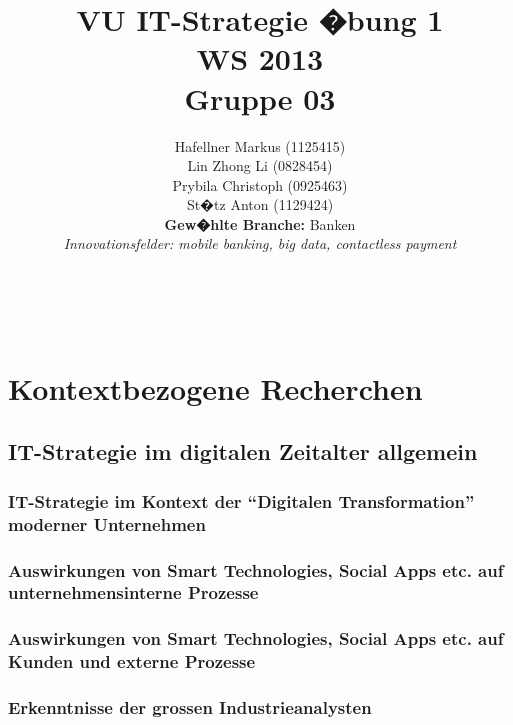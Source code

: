 \documentclass[a4paper, 11pt]{article} %
\title{\textbf{VU IT-Strategie �bung 1}\\ %
WS 2013\\\vspace{5pt}
Gruppe 03} %
\author{Hafellner Markus (1125415)\\
 Lin Zhong Li (0828454)\\
 Prybila Christoph (0925463)\\
 St�tz Anton (1129424)\\
 \vspace{10pt}
 \textbf{Gew�hlte Branche:} Banken
\\{\textit{Innovationsfelder: mobile banking, big data, contactless payment}}} %
\makeatletter
\renewcommand{\maketitle}{ %
\begin{flushright} %
{\LARGE\@title} %

\vspace{50pt} %

{\large\@author} %
\\ \vspace{10pt}\@date %

\vspace{40pt} %
\end{flushright}
}
\makeatother
\begin{document}
\maketitle %

\newpage

\tableofcontents

\newpage


\section{Kontextbezogene Recherchen}
\subsection{IT-Strategie im digitalen Zeitalter allgemein}
\label{subsec:StrategieAllgemein}

\subsubsection{IT-Strategie im Kontext der ``Digitalen Transformation'' moderner Unternehmen}


\subsubsection{Auswirkungen von Smart Technologies, Social Apps etc. auf unternehmensinterne Prozesse}


\subsubsection{Auswirkungen von Smart Technologies, Social Apps etc. auf Kunden und externe Prozesse}


\subsubsection{Erkenntnisse der grossen Industrieanalysten}

\end{document}
